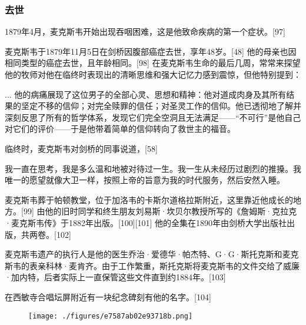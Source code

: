 \subsubsection{去世}  
1879年4月，麦克斯韦开始出现吞咽困难，这是他致命疾病的第一个症状。[97]

麦克斯韦于1879年11月5日在剑桥因腹部癌症去世，享年48岁。[48] 他的母亲也因相同类型的癌症去世，且年龄相同。[98] 在麦克斯韦生命的最后几周，常常来探望他的牧师对他在临终时表现出的清晰思维和强大记忆力感到震惊，但他特别提到：

... 他的病痛展现了这位男子的全部心灵、思想和精神：他对道成肉身及其所有结果的坚定不移的信仰；对完全赎罪的信任；对圣灵工作的信仰。他已透彻地了解并深刻反思了所有的哲学体系，发现它们完全空洞且无法满足——“不可行”是他自己对它们的评价——于是他带着简单的信仰转向了救世主的福音。

临终时，麦克斯韦对剑桥的同事说道，[58]

我一直在思考，我是多么温和地被对待过一生。我一生从未经历过剧烈的推搡。我唯一的愿望就像大卫一样，按照上帝的旨意为我的时代服务，然后安然入睡。

麦克斯韦葬于帕顿教堂，位于加洛韦的卡斯尔道格拉斯附近，这里靠近他成长的地方。[99] 由他的旧时同学和终生朋友刘易斯·坎贝尔教授所写的《詹姆斯·克拉克·麦克斯韦传》于1882年出版。[100][101] 他的全集在1890年由剑桥大学出版社出版，共两卷。[102]

麦克斯韦遗产的执行人是他的医生乔治·爱德华·帕杰特、G·G·斯托克斯和麦克斯韦的表亲科林·麦肯齐。由于工作繁重，斯托克斯将麦克斯韦的文件交给了威廉·加内特，后者实际上一直保管这些文件直到约1884年。[103]

在西敏寺合唱坛屏附近有一块纪念碑刻有他的名字。[104]

\begin{figure}[ht]
\centering
\texttt{[image: ./figures/e7587ab02e93718b.png]}
\caption{} \label{fig_Clerk_9}
\end{figure}